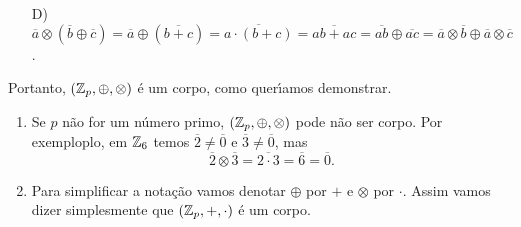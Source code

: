 \begin{prova}
\begin{enumerate}
\begin{align*}
			&\overline{ax} \oplus \overline{py} = \overline{1}\\
			&\overline{a} \otimes \overline{x} + \overline{p} \otimes \overline{y} = \overline{1}\\
			&\overline{a} \otimes \overline{x} = \overline{1}
		\end{align*}
		uma vez que $\overline{p} = \overline{0}$. Como $\overline{x}$ \'e obtido pelo resto da divis\~ao inteira de $x$ por $p$, ent\~ao 
		$\overline{x} \in \integer_p$. Observe que $x \ne 0$ pois $p \ge 2$ e $x \ne p$ pois sen\~ao $(a + p)y = 1$ o que \'e imposs{\'\i}vel uma vez que $p \ge 2$. Logo $\overline{x} \ne 0$ e assim todo elemento $\overline{a} \in \integer_p$ possui inverso multiplicativo.
		\item[D)] $\overline{a} \otimes (\overline{b} \oplus \overline{c}) = \overline{a} \oplus (\overline{b + c}) = \overline{a \cdot (b + c)} = \overline{ab + ac} = \overline{ab} \oplus \overline{ac} = \overline{a} \otimes \overline{b} \oplus \overline{a} \otimes \overline{c}$.
	\end{enumerate}
	Portanto, $(\mathbb{Z}_p, \oplus, \otimes)$ \'e um corpo, como quer{\'\i}amos demonstrar.
\end{prova}

\begin{observacao}
	\begin{enumerate}
		\item Se $p$ n\~ao for um n\'umero primo, $(\mathbb{Z}_p, \oplus, \otimes)$ pode n\~ao ser corpo. Por exemploplo, em $\mathbb{Z}_6$ temos $\overline{2} \ne \overline{0}$ e $\overline{3} \ne \overline{0}$, mas
	\[
	  \overline{2}\otimes \overline{3} = \overline{2\cdot 3} = \overline{6} = \overline{0}.
	\]

	\item Para simplificar a nota\c{c}\~ao vamos denotar $\oplus$ por $+$ e $\otimes$ por $\cdot$. Assim vamos dizer simplesmente que $(\mathbb{Z}_p, +, \cdot)$ \'e um corpo.
	\end{enumerate}
\end{observacao}






